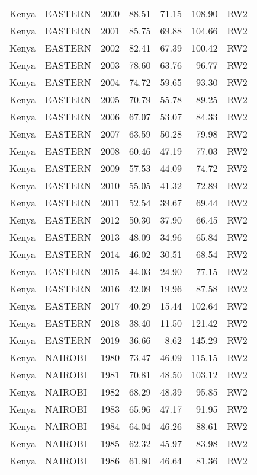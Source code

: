 \begin{longtable}{lllrrrl}
  Kenya & EASTERN & 2000 & 88.51 & 71.15 & 108.90 & RW2 \\ 
  Kenya & EASTERN & 2001 & 85.75 & 69.88 & 104.66 & RW2 \\ 
  Kenya & EASTERN & 2002 & 82.41 & 67.39 & 100.42 & RW2 \\ 
  Kenya & EASTERN & 2003 & 78.60 & 63.76 & 96.77 & RW2 \\ 
  Kenya & EASTERN & 2004 & 74.72 & 59.65 & 93.30 & RW2 \\ 
  Kenya & EASTERN & 2005 & 70.79 & 55.78 & 89.25 & RW2 \\ 
  Kenya & EASTERN & 2006 & 67.07 & 53.07 & 84.33 & RW2 \\ 
  Kenya & EASTERN & 2007 & 63.59 & 50.28 & 79.98 & RW2 \\ 
  Kenya & EASTERN & 2008 & 60.46 & 47.19 & 77.03 & RW2 \\ 
  Kenya & EASTERN & 2009 & 57.53 & 44.09 & 74.72 & RW2 \\ 
  Kenya & EASTERN & 2010 & 55.05 & 41.32 & 72.89 & RW2 \\ 
  Kenya & EASTERN & 2011 & 52.54 & 39.67 & 69.44 & RW2 \\ 
  Kenya & EASTERN & 2012 & 50.30 & 37.90 & 66.45 & RW2 \\ 
  Kenya & EASTERN & 2013 & 48.09 & 34.96 & 65.84 & RW2 \\ 
  Kenya & EASTERN & 2014 & 46.02 & 30.51 & 68.54 & RW2 \\ 
  Kenya & EASTERN & 2015 & 44.03 & 24.90 & 77.15 & RW2 \\ 
  Kenya & EASTERN & 2016 & 42.09 & 19.96 & 87.58 & RW2 \\ 
  Kenya & EASTERN & 2017 & 40.29 & 15.44 & 102.64 & RW2 \\ 
  Kenya & EASTERN & 2018 & 38.40 & 11.50 & 121.42 & RW2 \\ 
  Kenya & EASTERN & 2019 & 36.66 & 8.62 & 145.29 & RW2 \\ 
  Kenya & NAIROBI & 1980 & 73.47 & 46.09 & 115.15 & RW2 \\ 
  Kenya & NAIROBI & 1981 & 70.81 & 48.50 & 103.12 & RW2 \\ 
  Kenya & NAIROBI & 1982 & 68.29 & 48.39 & 95.85 & RW2 \\ 
  Kenya & NAIROBI & 1983 & 65.96 & 47.17 & 91.95 & RW2 \\ 
  Kenya & NAIROBI & 1984 & 64.04 & 46.26 & 88.61 & RW2 \\ 
  Kenya & NAIROBI & 1985 & 62.32 & 45.97 & 83.98 & RW2 \\ 
  Kenya & NAIROBI & 1986 & 61.80 & 46.64 & 81.36 & RW2 \\ 

\end{longtable}
